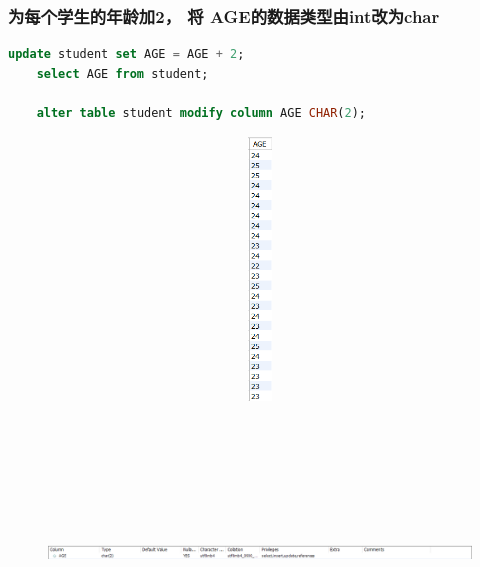 \documentclass{ctexart}
\begin{document}
\subsubsection{为每个学生的年龄加2， 将 AGE的数据类型由int改为char}
\begin{lstlisting}[language=sql]
	update student set AGE = AGE + 2;  
	select AGE from student;  
	  
	alter table student modify column AGE CHAR(2);
\end{lstlisting}
\begin{figure}[H]
	\centering 
	\includegraphics[height=7cm,width=14cm]{8.png}
	\end{figure}
	\begin{figure}[H]
		\centering 
		\includegraphics[height=7cm,width=14cm]{9.png}
		\end{figure}
\end{document}
